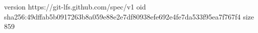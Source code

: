 version https://git-lfs.github.com/spec/v1
oid sha256:49dffab5b0917263b8a059e88e2e7df80938efe692e4fe7da533f95ea7f767f4
size 859
